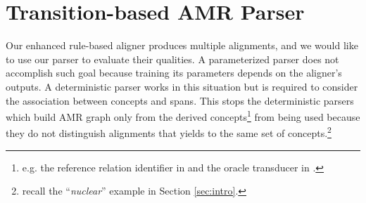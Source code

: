 \documentclass[11pt,a4paper]{article}
\begin{document}
\section{Transition-based AMR Parser}



Our enhanced rule-based aligner produces multiple alignments, and
we would like to use our parser to evaluate their qualities.
A parameterized parser does not accomplish such goal because
training its parameters depends on the aligner's outputs.
A deterministic parser works in this situation but is required to consider
the association between concepts and spans.
This stops the deterministic parsers which build AMR graph only from
the derived concepts\footnote{e.g. the reference relation identifier in \citet{flanigan-EtAl:2014:P14-1}
	and the oracle transducer in \citet{wang-xue-pradhan:2015:NAACL-HLT}.}
from being used because
they do not distinguish alignments that yields to the same set of concepts.\footnote{recall the ``\textit{nuclear}'' example in Section \ref{sec:intro}.}
\end{document}
